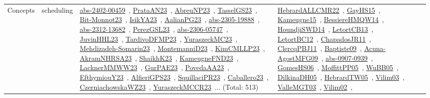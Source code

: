 {\begin{longtable}{lp{3cm}>{\raggedright\arraybackslash}p{6cm}>{\raggedright\arraybackslash}p{6cm}>{\raggedright\arraybackslash}p{8cm}}
Concepts & scheduling & \href{works/abs-2402-00459.pdf}{abs-2402-00459}~\cite{abs-2402-00459}, \href{works/PrataAN23.pdf}{PrataAN23}~\cite{PrataAN23}, \href{works/AbreuNP23.pdf}{AbreuNP23}~\cite{AbreuNP23}, \href{works/TasselGS23.pdf}{TasselGS23}~\cite{TasselGS23}, \href{works/Bit-Monnot23.pdf}{Bit-Monnot23}~\cite{Bit-Monnot23}, \href{works/IsikYA23.pdf}{IsikYA23}~\cite{IsikYA23}, \href{works/AalianPG23.pdf}{AalianPG23}~\cite{AalianPG23}, \href{works/abs-2305-19888.pdf}{abs-2305-19888}~\cite{abs-2305-19888}, \href{works/abs-2312-13682.pdf}{abs-2312-13682}~\cite{abs-2312-13682}, \href{works/PerezGSL23.pdf}{PerezGSL23}~\cite{PerezGSL23}, \href{works/abs-2306-05747.pdf}{abs-2306-05747}~\cite{abs-2306-05747}, \href{works/JuvinHHL23.pdf}{JuvinHHL23}~\cite{JuvinHHL23}, \href{works/TardivoDFMP23.pdf}{TardivoDFMP23}~\cite{TardivoDFMP23}, \href{works/YuraszeckMC23.pdf}{YuraszeckMC23}~\cite{YuraszeckMC23}, \href{works/Mehdizadeh-Somarin23.pdf}{Mehdizadeh-Somarin23}~\cite{Mehdizadeh-Somarin23}, \href{works/MontemanniD23.pdf}{MontemanniD23}~\cite{MontemanniD23}, \href{works/KimCMLLP23.pdf}{KimCMLLP23}~\cite{KimCMLLP23}, \href{works/AkramNHRSA23.pdf}{AkramNHRSA23}~\cite{AkramNHRSA23}, \href{works/ShaikhK23.pdf}{ShaikhK23}~\cite{ShaikhK23}, \href{works/KameugneFND23.pdf}{KameugneFND23}~\cite{KameugneFND23}, \href{works/LacknerMMWW23.pdf}{LacknerMMWW23}~\cite{LacknerMMWW23}, \href{works/GurPAE23.pdf}{GurPAE23}~\cite{GurPAE23}, \href{works/PovedaAA23.pdf}{PovedaAA23}~\cite{PovedaAA23}, \href{works/EfthymiouY23.pdf}{EfthymiouY23}~\cite{EfthymiouY23}, \href{works/AlfieriGPS23.pdf}{AlfieriGPS23}~\cite{AlfieriGPS23}, \href{works/SquillaciPR23.pdf}{SquillaciPR23}~\cite{SquillaciPR23}, \href{works/Caballero23.pdf}{Caballero23}~\cite{Caballero23}, \href{works/CzerniachowskaWZ23.pdf}{CzerniachowskaWZ23}~\cite{CzerniachowskaWZ23}, \href{works/YuraszeckMCCR23.pdf}{YuraszeckMCCR23}~\cite{YuraszeckMCCR23}... (Total: 513) & \href{works/HebrardALLCMR22.pdf}{HebrardALLCMR22}~\cite{HebrardALLCMR22}, \href{works/GayHS15.pdf}{GayHS15}~\cite{GayHS15}, \href{works/Kameugne15.pdf}{Kameugne15}~\cite{Kameugne15}, \href{works/BessiereHMQW14.pdf}{BessiereHMQW14}~\cite{BessiereHMQW14}, \href{works/HoundjiSWD14.pdf}{HoundjiSWD14}~\cite{HoundjiSWD14}, \href{works/LetortCB13.pdf}{LetortCB13}~\cite{LetortCB13}, \href{works/LetortBC12.pdf}{LetortBC12}~\cite{LetortBC12}, \href{works/ChapadosJR11.pdf}{ChapadosJR11}~\cite{ChapadosJR11}, \href{works/ClercqPBJ11.pdf}{ClercqPBJ11}~\cite{ClercqPBJ11}, \href{works/Baptiste09.pdf}{Baptiste09}~\cite{Baptiste09}, \href{works/Acuna-AgostMFG09.pdf}{Acuna-AgostMFG09}~\cite{Acuna-AgostMFG09}, \href{works/abs-0907-0939.pdf}{abs-0907-0939}~\cite{abs-0907-0939}, \href{works/GomesHS06.pdf}{GomesHS06}~\cite{GomesHS06}, \href{works/MoffittPP05.pdf}{MoffittPP05}~\cite{MoffittPP05}, \href{works/WuBB05.pdf}{WuBB05}~\cite{WuBB05}, \href{works/DilkinaDH05.pdf}{DilkinaDH05}~\cite{DilkinaDH05}, \href{works/HebrardTW05.pdf}{HebrardTW05}~\cite{HebrardTW05}, \href{works/Vilim03.pdf}{Vilim03}~\cite{Vilim03}, \href{works/ValleMGT03.pdf}{ValleMGT03}~\cite{ValleMGT03}, \href{works/Vilim02.pdf}{Vilim02}~\cite{Vilim02}, 
\end{longtable}}
